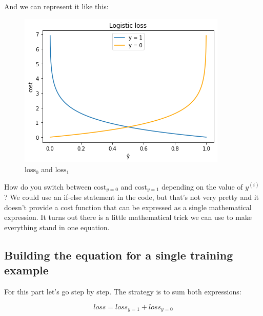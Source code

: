 And we can represent it like this:
\begin{figure}[!h]
    \centering
    \includegraphics[scale=0.55]{assets/log_loss.png}
    \caption{$\text{loss}_0$ and $\text{loss}_1$}
\end{figure}

How do you switch between $\text{cost}_{y=0}$ and $\text{cost}_{y=1}$ depending on the value of $y^{(i)}$? We could use an if-else statement in the code, but that's not very pretty and it doesn't provide a cost function that can be expressed as a single mathematical expression.
It turns out there is a little mathematical trick we can use to make everything stand in one equation.

\newpage
\subsection*{Building the equation for a single training example}
For this part let's go step by step.
The strategy is to sum both expressions:

$$
loss = loss_{y=1} + loss_{y=0}
$$


